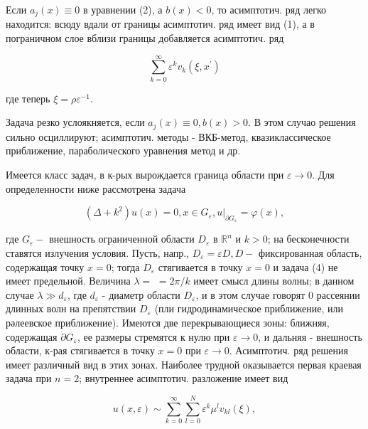 \documentclass[10pt]{article}
\begin{document}
Если $a_{j}(x) \equiv 0$ в уравнении (2), а $b(x)<0$, то асимптотич. ряд легко находится: всюду вдали от границы асимптотич. ряд имеет вид (1), а в пограничном слое вблизи границы добавляется асимптотич. ряд



\[

\sum_{k=0}^{\infty} \varepsilon^{k} v_{k}\left(\xi, x^{\prime}\right)

\]



где теперь $\xi=\rho \varepsilon^{-1}$.



Задача резко услоякняется, если $a_{j}(x) \equiv 0, b(x)>0$. В этом случао решения сильно осциллируют; асимптотич. методы - ВКБ-метод, квазиклассическое приближение, параболического уравнения метод и др.



Имеется класс задач, в к-рых вырождается граница области при $\varepsilon \rightarrow 0$. Для определенности ниже рассмотрена задача



\[

\left(\Delta+k^{2}\right) u(x)=0, x \in G_{\varepsilon},\left.u\right|_{\partial G_{\varepsilon}}=\varphi(x),

\]



где $G_{\varepsilon}-$ внешность ограниченной области $D_{\varepsilon}$ в $\mathbb{R}^{n}$ и $k>0$; на бесконечности ставятся излучения условия. Пусть, напр., $D_{\varepsilon}=\varepsilon D, D-$ фиксированная область, содержащая точку $x=0$; тогда $D_{\varepsilon}$ стягивается в точку $x=0$ и задача (4) не имеет предельной. Величина $\lambda=$ $=2 \pi / k$ имеет смысл длины волны; в данном случае $\lambda \gg d_{\varepsilon}$, где $d_{\varepsilon}$ - диаметр области $D_{\varepsilon}$, и в этом случае говорят 0 рассеянии длинных волн на препятствии $D_{\varepsilon}$ (пли гидродинамическое приближение, или рәлеевское приближение). Имеются две перекрывающиеся зоны: ближняя, содержащая $\partial G_{\varepsilon}$, ее размеры стремятся к нулю при $\varepsilon \rightarrow 0$, и дальняя - внешность области, к-рая стягивается в точку $x=0$ при $\varepsilon \rightarrow 0$. Асимптотич. ряд решения имеет различный вид в этих зонах. Наиболее трудной оказывается первая краевая задача при $n=2$; внутреннее асимптотич. разложение имеет вид



\[

u(x, \varepsilon) \sim \sum_{k=0}^{\infty} \sum_{l=0}^{N} \varepsilon^{k} \mu^{l} v_{k l}(\xi),

\]
\end{document}
